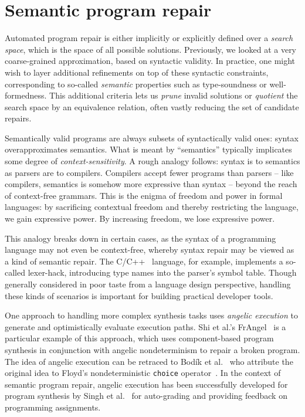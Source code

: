 \section{Semantic program repair}

Automated program repair is either implicitly or explicitly defined over a \textit{search space}, which is the space of all possible solutions. Previously, we looked at a very coarse-grained approximation, based on syntactic validity. In practice, one might wish to layer additional refinements on top of these syntactic constraints, corresponding to so-called \textit{semantic} properties such as type-soundness or well-formedness. This additional criteria lets us \textit{prune} invalid solutions or \textit{quotient} the search space by an equivalence relation, often vastly reducing the set of candidate repairs.

Semantically valid programs are always subsets of syntactically valid ones: syntax overapproximates semantics. What is meant by ``semantics'' typically implicates some degree of \textit{context-sensitivity}. A rough analogy follows: syntax is to semantics as parsers are to compilers. Compilers accept fewer programs than parsers -- like compilers, semantics is somehow more expressive than syntax -- beyond the reach of context-free grammars. This is the enigma of freedom and power in formal languages: by sacrificing contextual freedom and thereby restricting the language, we gain expressive power. By increasing freedom, we lose expressive power.

This analogy breaks down in certain cases, as the syntax of a programming language may not even be context-free, whereby syntax repair may be viewed as a kind of semantic repair. The C/C++~\cite{mcpeak2004elkhound} language, for example, implements a so-called lexer-hack, introducing type names into the parser's symbol table. Though generally considered in poor taste from a language design perspective, handling these kinds of scenarios is important for building practical developer tools.

One approach to handling more complex synthesis tasks uses \textit{angelic execution} to generate and optimistically evaluate execution paths. Shi et al.'s FrAngel~\cite{shi2019frangel} is a particular example of this approach, which uses component-based program synthesis in conjunction with angelic nondeterminism to repair a broken program. The idea of angelic execution can be retraced to Bod\'ik et al.~\cite{bodik2010programming} who attribute the original idea to Floyd's nondeterministic \texttt{choice} operator~\cite{floyd1967nondeterministic}. In the context of semantic program repair, angelic execution has been successfully developed for program synthesis by Singh et al.~\cite{singh2013automated} for auto-grading and providing feedback on programming assignments.

